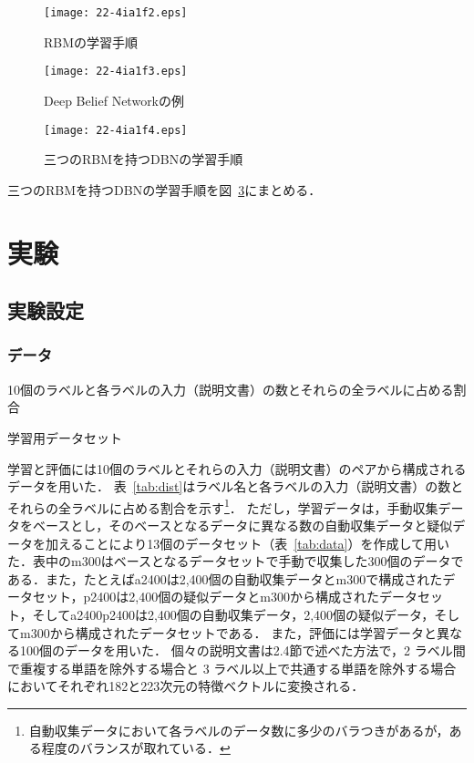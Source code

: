 \documentclass[japanese]{jnlp_1.4}
\begin{document}
\begin{figure}[b]
\vspace{-0.5\Cvs}
\begin{center}
\texttt{[image: 22-4ia1f2.eps]}
\end{center}
\caption{RBMの学習手順}
\label{fig:procedure-RBM}
\end{figure}
\begin{figure}[b]
\begin{center}
\texttt{[image: 22-4ia1f3.eps]}
\end{center}
\caption{Deep Belief Networkの例}
\label{fig_dbn}
\end{figure}
\begin{figure}[b]
\begin{center}
\texttt{[image: 22-4ia1f4.eps]}
\end{center}
\caption{三つのRBMを持つDBNの学習手順}
\label{fig:procedure-DBN}
\end{figure}


三つのRBMを持つDBNの学習手順を図~\ref{fig:procedure-DBN}にまとめる． 


\section{実験}

\subsection{実験設定}

\subsubsection{データ}

\begin{table}[b]
\caption{10個のラベルと各ラベルの入力（説明文書）の数とそれらの全ラベルに占める割合}
\label{tab:dist}

\vspace{-0.5\Cvs}
\end{table}
\begin{table}[b]
\caption{学習用データセット}
\label{tab:data}

\end{table}


学習と評価には10個のラベルとそれらの入力（説明文書）のペアから構成されるデータを用いた．
表~\ref{tab:dist}はラベル名と各ラベルの入力（説明文書）の数とそれらの全ラベルに占める割合を示す\footnote{自動収集データにおいて各ラベルのデータ数に多少のバラつきがあるが，ある程度のバランスが取れている．}．
ただし，学習データは，手動収集データをベースとし，そのベースとなるデータに異なる数の自動収集データと疑似データを加えることにより13個のデータセット（表~\ref{tab:data}）を作成して用いた．表中のm300はベースとなるデータセットで手動で収集した300個のデータである．また，たとえばa2400は2,400個の自動収集データとm300で構成されたデータセット，p2400は2,400個の疑似データとm300から構成されたデータセット，そしてa2400p2400は2,400個の自動収集データ，2,400個の疑似データ，そしてm300から構成されたデータセットである．
また，評価には学習データと異なる100個のデータを用いた． 個々の説明文書は2.4節で述べた方法で，2 ラベル間で重複する単語を除外する場合と 3 ラベル以上で共通する単語を除外する場合においてそれぞれ182と223次元の特徴ベクトルに変換される．
\end{document}
